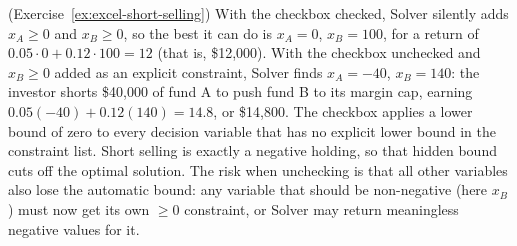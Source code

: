 \begin{solution}(Exercise~\ref{ex:excel-short-selling})
With the checkbox checked, Solver silently adds $x_A \geq 0$ and $x_B \geq 0$, so the best it can do is $x_A = 0$, $x_B = 100$, for a return of $0.05 \cdot 0 + 0.12 \cdot 100 = 12$ (that is, \$12{,}000).  With the checkbox unchecked and $x_B \geq 0$ added as an explicit constraint, Solver finds $x_A = -40$, $x_B = 140$: the investor shorts \$40{,}000 of fund A to push fund B to its margin cap, earning $0.05(-40) + 0.12(140) = 14.8$, or \$14{,}800.
The checkbox applies a lower bound of zero to every decision variable that has no explicit lower bound in the constraint list.  Short selling is exactly a negative holding, so that hidden bound cuts off the optimal solution.  The risk when unchecking is that all other variables also lose the automatic bound: any variable that should be non-negative (here $x_B$) must now get its own $\geq 0$ constraint, or Solver may return meaningless negative values for it.
\end{solution}

